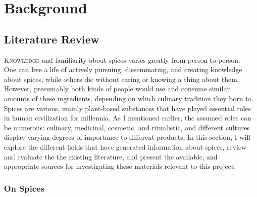 \chapter{Background}
\label{ch:background}


\section{Literature Review}

\lettrine[lines=\iniciale]{\textcolor{\accentcolor}{K}}{nowledge} and familiarity about spices varies greatly from person to person. One can live a life of actively pursuing, disseminating, and creating knowledge about spices, while others die without caring or knowing a thing about them. However, presumably both kinds of people would use and consume similar amounts of these ingredients, depending on which culinary tradition they born to. Spices are various, mainly plant-based substances that have played essential roles in human civilization for millennia. As I mentioned earlier, the assumed roles can be numerous: culinary, medicinal, cosmetic, and ritualistic, and different cultures display varying degrees of importance to different products. 
In this section, I will explore the different fields that have generated information about spices, review and evaluate the the existing literature, and present the available, and appropriate sources for investigating these materials relevant to this project.

\subsection{On Spices}

